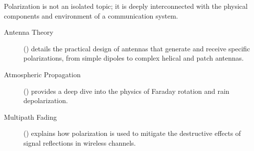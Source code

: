 \begin{importantbox}[title={Further Reading}]
    Polarization is not an isolated topic; it is deeply interconnected with the physical components and environment of a communication system.
    \begin{description}
        \item[Antenna Theory] () details the practical design of antennas that generate and receive specific polarizations, from simple dipoles to complex helical and patch antennas.
        \item[Atmospheric Propagation] () provides a deep dive into the physics of Faraday rotation and rain depolarization.
        \item[Multipath Fading] () explains how polarization is used to mitigate the destructive effects of signal reflections in wireless channels.
    \end{description}
\end{importantbox}